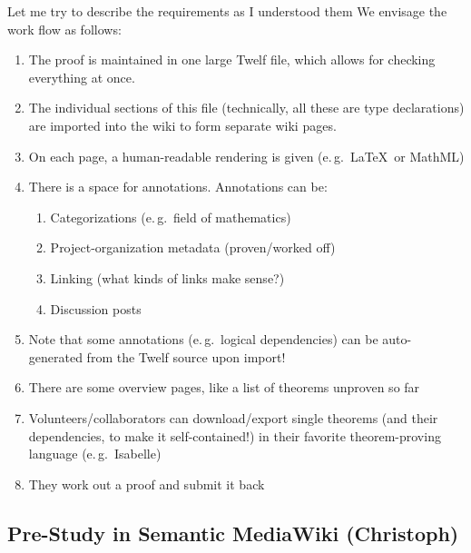 \documentclass{llncs}
\begin{document}
\begin{newpart}{Let me try to describe the requirements as I understood them}
  We envisage the work flow as follows:
  \begin{enumerate}
  \item The proof is maintained in one large Twelf file, which allows for checking
    everything at once.
  \item The individual sections of this file (technically, all these are type
    declarations) are imported into the wiki to form separate wiki pages.
  \item On each page, a human-readable rendering is given (e.\,g.\ \LaTeX\ or MathML)
  \item There is a space for annotations.  Annotations can be:
    \begin{enumerate}
    \item Categorizations (e.\,g.\ field of mathematics)
    \item Project-organization metadata (proven/worked off)
    \item Linking (what kinds of links make sense?)
    \item Discussion posts
    \end{enumerate}
  \item Note that some annotations (e.\,g.\ logical dependencies) can be auto-generated
    from the Twelf source upon import!
  \item There are some overview pages, like a list of theorems unproven so far
  \item Volunteers/collaborators can download/export single theorems (and their
    dependencies, to make it self-contained!) in their favorite theorem-proving language
    (e.\,g.\ Isabelle)
  \item They work out a proof and submit it back
  \end{enumerate}
\end{newpart}

\subsection{Pre-Study in Semantic MediaWiki (Christoph)}
\label{sec:smw-study}
\end{document}
